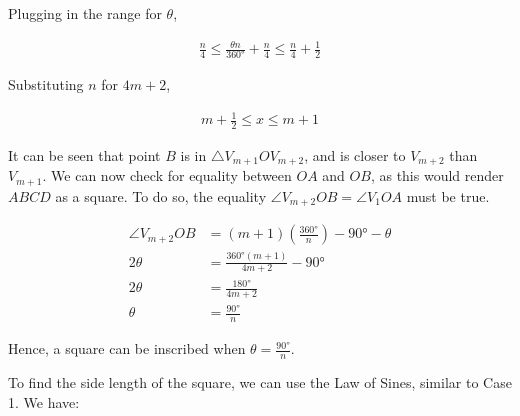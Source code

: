 \documentclass[12pt]{scrartcl}
\begin{document}
Plugging in the range for $\theta$,

\begin{align*}
	\frac{n}{4} \leq \frac{\theta n}{\ang{360}} + \frac{n}{4} \leq \frac{n}{4} + \frac{1}{2}
\end{align*}

Substituting $n$ for $4m + 2$,

\begin{align*}
	m + \frac{1}{2} \leq x \leq m + 1
\end{align*}

It can be seen that point $B$ is in $\triangle V_{m+1}OV_{m+2}$, and is closer to $V_{m+2}$ than $V_{m+1}$.
We can now check for equality between $OA$ and $OB$, as this would render $ABCD$ as a square.
To do so, the equality $\angle V_{m+2}OB = \angle V_{1}OA$ must be true.

\begin{align*}
	\angle V_{m+2}OB & = \left(m+1\right)\left(\frac{\ang{360}}{n}\right) - \ang{90} - \theta \\
	2\theta          & = \frac{\ang{360}\left(m+1\right)}{4m+2} - \ang{90}                    \\
	2\theta          & = \frac{\ang{180}}{4m+2}                                               \\
	\theta           & = \frac{\ang{90}}{n}
\end{align*}

Hence, a square can be inscribed when $\theta = \frac{\ang{90}}{n}$.

To find the side length of the square, we can use the Law of Sines, similar to Case 1. We have:
\end{document}
